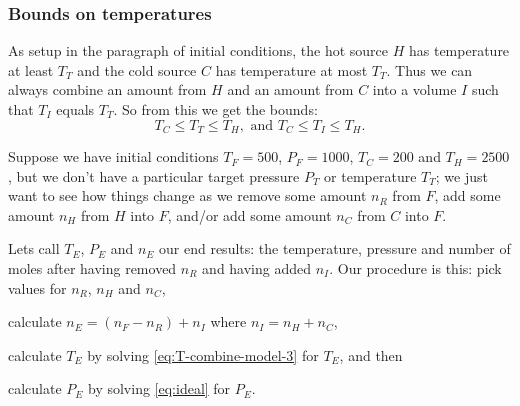 \documentclass{article}
\begin{document}
\subsubsection*{Bounds on temperatures}

As setup in the paragraph of initial conditions, the hot source $H$ has temperature at least $T_T$
and the cold source $C$ has temperature at most $T_T$.
Thus we can always combine an amount from
$H$ and an amount from $C$ into a volume $I$ such that $T_I$ equals $T_T$.
So from this we get the bounds:
\[
    T_C\le T_T\le T_H,\text{ and }T_C\le T_I\le T_H.
\]
\begin{example}
    Suppose we have initial conditions $T_F=500$, $P_F=1000$, $T_C=200$ and $T_H=2500$,
    but we don't have a particular target pressure $P_T$ or temperature $T_T$;
    we just want to see how things change as we remove some amount $n_R$ from $F$,
    add some amount $n_H$ from $H$ into $F$,
    and/or add some amount $n_C$ from $C$ into $F$.

    Lets call $T_E$, $P_E$ and $n_E$ our end results: the temperature, pressure and number
    of moles after having removed $n_R$ and having added $n_I$.
    Our procedure is this: pick values for $n_R$, $n_H$ and $n_C$,
    \begin{enumerate*}[label=(\alph*)]
        \item calculate $n_E=(n_F-n_R)+n_I$ where $n_I=n_H+n_C$,
        \item calculate $T_E$ by solving \autoref{eq:T-combine-model-3} for $T_E$, and then
        \item calculate $P_E$ by solving \autoref{eq:ideal} for $P_E$.
    \end{enumerate*}


\end{example}
\end{document}
